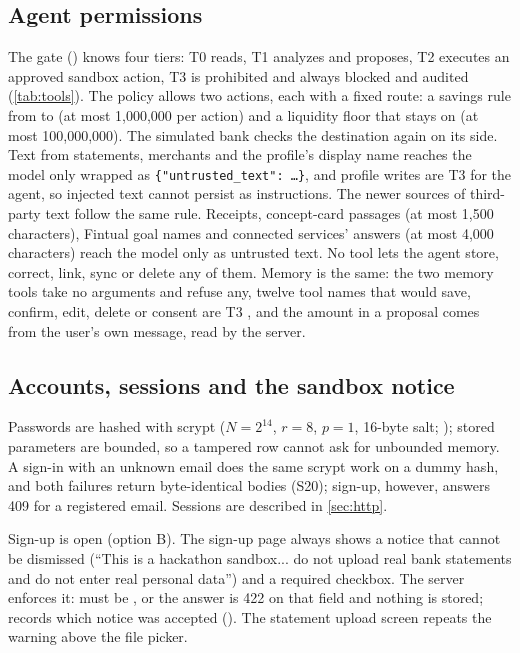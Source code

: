 \subsection{Agent permissions}

The gate () knows four tiers: T0 reads, T1 analyzes and proposes, T2 executes an
approved sandbox action, T3 is prohibited and always blocked and audited (\cref{tab:tools}). The policy
 allows two actions, each with a fixed route: a savings rule from  to
 (at most 1{,}000{,}000 per action) and a liquidity floor that stays on  (at most
100{,}000{,}000). The simulated bank checks the destination again on its side. Text from statements, merchants and
the profile's display name reaches the model only wrapped as \texttt{\{"untrusted\_text": \dots\}}, and profile writes are T3
for the agent, so injected text cannot persist as instructions. The newer sources of third-party text follow the
same rule. Receipts, concept-card passages (at most 1{,}500 characters), Fintual goal names and connected services'
answers (at most 4{,}000 characters) reach the model only as untrusted text. No tool lets the agent store,
correct, link, sync or delete any of them. Memory is the same: the two memory tools take no arguments and refuse any,
twelve tool names that would save, confirm, edit, delete or consent are T3 , and the amount in a
proposal comes from the user's own message, read by the server.

\subsection{Accounts, sessions and the sandbox notice}\label{sec:notice}

Passwords are hashed with scrypt ($N = 2^{14}$, $r = 8$, $p = 1$, 16-byte salt; );
stored parameters are bounded, so a tampered row cannot ask for unbounded memory. A sign-in with an unknown email does the
same scrypt work on a dummy hash, and both failures return byte-identical bodies (S20); sign-up, however, answers 409
for a registered email. Sessions are described in \cref{sec:http}.

Sign-up is open (option B). The sign-up page always shows a notice that cannot be dismissed (``This is a hackathon
sandbox... do not upload real bank statements and do not enter real personal data'') and a required checkbox. The
server enforces it:  must be , or the answer is 422 on that field and
nothing is stored;  records which notice was accepted (). The
statement upload screen repeats the warning above the file picker.

